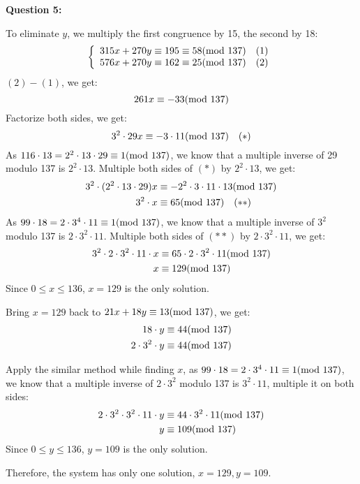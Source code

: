 \documentclass[a4paper,11pt]{article}
\begin{document}
\begin{spacing}{1.4}
    \vspace{20pt}

    \textbf{Question 5:}

    To eliminate $y$, we multiply the first congruence by 15,
    the second by 18:
    \begin{align*}
        \left\{
            \begin{array}{l}
                315x+270y\equiv 195\equiv 58 {\rm (mod\ 137)}\ \ \ (1)\\
                576x+270y\equiv 162\equiv 25 {\rm (mod\ 137)}\ \ \ (2)
            \end{array}
        \right.
    \end{align*}
    $(2)-(1)$, we get:
    $$261x\equiv -33 {\rm (mod\ 137)}$$
    Factorize both sides, we get:
    $$3^2\cdot 29x\equiv -3\cdot 11 {\rm (mod\ 137)}\ \ \ (*)$$
    As $116\cdot 13=2^2\cdot 13\cdot 29\equiv 1 {\rm (mod\ 137)}$,
    we know that a multiple inverse of 29 modulo 137 is $2^2\cdot 13$.
    Multiple both sides of $(*)$ by $2^2\cdot 13$, we get:
    \begin{align*}
        3^2\cdot (2^2\cdot 13\cdot 29)x &\equiv 
        -2^2\cdot 3\cdot 11\cdot 13 {\rm (mod\ 137)}\\
        3^2\cdot x &\equiv 65 {\rm (mod\ 137)}\ \ \ (**)
    \end{align*}
    As $99\cdot 18=2\cdot 3^4\cdot 11\equiv 1 {\rm (mod\ 137)}$,
    we know that a multiple inverse of $3^2$ modulo 137 is 
    $2\cdot 3^2\cdot 11$.
    Multiple both sides of $(**)$ by $2\cdot 3^2\cdot 11$, we get:
    \begin{align*}
        3^2\cdot 2\cdot 3^2\cdot 11\cdot x &\equiv 
        65\cdot 2\cdot 3^2\cdot 11 {\rm (mod\ 137)}\\
        x &\equiv 129 {\rm (mod\ 137)}
    \end{align*}
    Since $0\le x\le 136$, $x=129$ is the only solution.

    Bring $x=129$ back to $21x+18y\equiv 13 {\rm (mod\ 137)}$,
    we get:
    \begin{align*}
        18\cdot y &\equiv 44 {\rm (mod\ 137)}\\
        2\cdot 3^2\cdot y &\equiv 44 {\rm (mod\ 137)}
    \end{align*}

    Apply the similar method while finding $x$,
    as $99\cdot 18=2\cdot 3^4\cdot 11\equiv 1 {\rm (mod\ 137)}$,
    we know that a multiple inverse of $2\cdot 3^2$ modulo 137 is 
    $3^2\cdot 11$, multiple it on both sides:
    \begin{align*}
        2\cdot 3^2\cdot 3^2\cdot 11\cdot y &\equiv 
        44\cdot 3^2\cdot 11 {\rm (mod\ 137)}\\
        y &\equiv 109 {\rm (mod\ 137)}
    \end{align*}
    Since $0\le y\le 136$, $y=109$ is the only solution.

    Therefore, the system has only one solution,
    $x=129, y=109$.
    

    \end{spacing}
\end{document}
